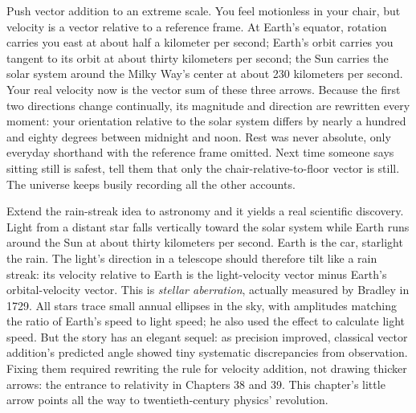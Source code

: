 
\begin{thought}
Push vector addition to an extreme scale. You feel motionless in your chair, but velocity is a vector relative to a reference frame. At Earth's equator, rotation carries you east at about half a kilometer per second; Earth's orbit carries you tangent to its orbit at about thirty kilometers per second; the Sun carries the solar system around the Milky Way's center at about 230 kilometers per second. Your real velocity now is the vector sum of these three arrows. Because the first two directions change continually, its magnitude and direction are rewritten every moment: your orientation relative to the solar system differs by nearly a hundred and eighty degrees between midnight and noon. Rest was never absolute, only everyday shorthand with the reference frame omitted. Next time someone says sitting still is safest, tell them that only the chair-relative-to-floor vector is still. The universe keeps busily recording all the other accounts.
\end{thought}

\begin{thought}
Extend the rain-streak idea to astronomy and it yields a real scientific discovery. Light from a distant star falls vertically toward the solar system while Earth runs around the Sun at about thirty kilometers per second. Earth is the car, starlight the rain. The light's direction in a telescope should therefore tilt like a rain streak: its velocity relative to Earth is the light-velocity vector minus Earth's orbital-velocity vector. This is \emph{stellar aberration}, actually measured by Bradley in 1729. All stars trace small annual ellipses in the sky, with amplitudes matching the ratio of Earth's speed to light speed; he also used the effect to calculate light speed. But the story has an elegant sequel: as precision improved, classical vector addition's predicted angle showed tiny systematic discrepancies from observation. Fixing them required rewriting the rule for velocity addition, not drawing thicker arrows: the entrance to relativity in Chapters 38 and 39. This chapter's little arrow points all the way to twentieth-century physics' revolution.
\end{thought}

